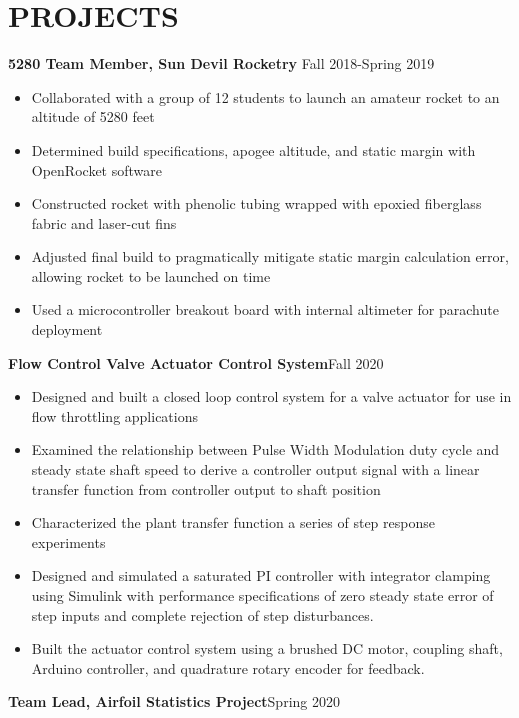 \documentclass{article}
\begin{document}
\section{PROJECTS}
\textbf{5280 Team Member, Sun Devil Rocketry}
\hfill Fall 2018-Spring 2019
\vspace{0.5em}
\begin{itemize}
	\item Collaborated with a group of 12 students to launch an amateur rocket to an altitude of 5280 feet
	\item Determined build specifications, apogee altitude, and static margin with OpenRocket software
	\item Constructed rocket with phenolic tubing wrapped with epoxied fiberglass fabric and laser-cut fins 
	\item Adjusted final build to pragmatically mitigate static margin calculation error, allowing rocket to be launched on time
	\item Used a microcontroller breakout board with internal altimeter for parachute deployment
\end{itemize}
\vspace{0.5em}
\textbf{Flow Control Valve Actuator Control System}\hfill Fall 2020
\vspace{0.5em}
\begin{itemize}
	\item Designed and built a closed loop control system for a valve actuator for use in flow throttling applications
	\item Examined the relationship between Pulse Width Modulation duty cycle and steady state shaft speed to derive a controller output signal with a linear transfer function from controller output to shaft position  
	\item Characterized the plant transfer function a series of step response experiments
	\item  Designed and simulated a saturated PI controller with integrator clamping using Simulink with performance specifications of zero steady state error of step inputs and complete rejection of step disturbances.
	\item  Built the actuator control system using a brushed DC motor, coupling shaft, Arduino controller, and quadrature rotary encoder for feedback.
\end{itemize}
\vspace{0.5em}
\textbf{Team Lead, Airfoil Statistics Project}\hfill Spring 2020
\vspace{0.5em}
\end{document}
